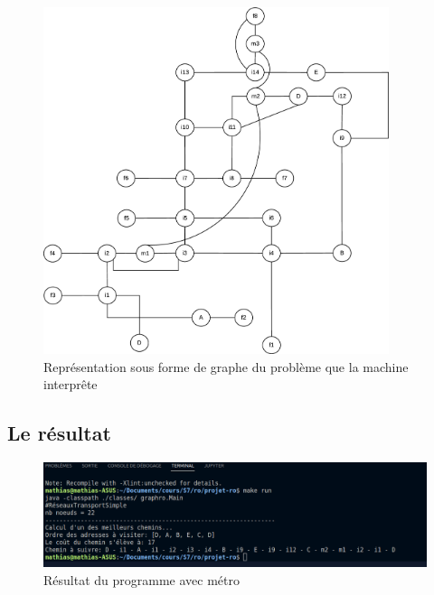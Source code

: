     \begin{figure}[h!]
            \centering
                \includegraphics[width=0.9\textwidth]{images/grapheProgramme.eps}
            \caption{Représentation sous forme de graphe du problème que la machine interprête}
            \label{fig:graphe} %
    \end{figure}

    \pagebreak


  \subsection{Le résultat}

    \begin{figure}[h!]
            \centering
                \includegraphics[width=1\textwidth]{images/resultatAvecMetro.png}
            \caption{Résultat du programme avec métro}
            \label{fig:graphe} %
    \end{figure}

